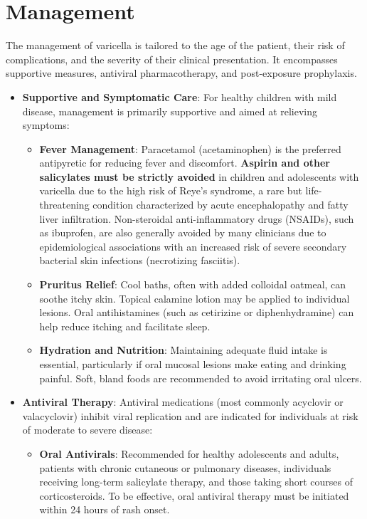 \section*{Management}
The management of varicella is tailored to the age of the patient, their risk of complications, and the severity of their clinical presentation. It encompasses supportive measures, antiviral pharmacotherapy, and post-exposure prophylaxis.

\begin{itemize}
    \item \textbf{Supportive and Symptomatic Care}: For healthy children with mild disease, management is primarily supportive and aimed at relieving symptoms:
    \begin{itemize}
        \item \textbf{Fever Management}: Paracetamol (acetaminophen) is the preferred antipyretic for reducing fever and discomfort. \textbf{Aspirin and other salicylates must be strictly avoided} in children and adolescents with varicella due to the high risk of Reye's syndrome, a rare but life-threatening condition characterized by acute encephalopathy and fatty liver infiltration. Non-steroidal anti-inflammatory drugs (NSAIDs), such as ibuprofen, are also generally avoided by many clinicians due to epidemiological associations with an increased risk of severe secondary bacterial skin infections (necrotizing fasciitis).
        \item \textbf{Pruritus Relief}: Cool baths, often with added colloidal oatmeal, can soothe itchy skin. Topical calamine lotion may be applied to individual lesions. Oral antihistamines (such as cetirizine or diphenhydramine) can help reduce itching and facilitate sleep.
        \item \textbf{Hydration and Nutrition}: Maintaining adequate fluid intake is essential, particularly if oral mucosal lesions make eating and drinking painful. Soft, bland foods are recommended to avoid irritating oral ulcers.
    \end{itemize}
    \item \textbf{Antiviral Therapy}: Antiviral medications (most commonly acyclovir or valacyclovir) inhibit viral replication and are indicated for individuals at risk of moderate to severe disease:
    \begin{itemize}
        \item \textbf{Oral Antivirals}: Recommended for healthy adolescents and adults, patients with chronic cutaneous or pulmonary diseases, individuals receiving long-term salicylate therapy, and those taking short courses of corticosteroids. To be effective, oral antiviral therapy must be initiated within 24 hours of rash onset.

\end{itemize}
\end{itemize}
